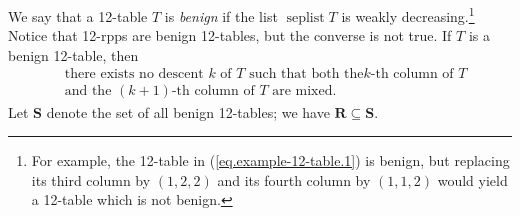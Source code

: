 \documentclass[numbers=enddot,12pt,final,onecolumn,notitlepage]{scrartcl}%
\theoremstyle{definition}
\begin{document}
We say that a 12-table $T$ is \textit{benign} if the list
$\operatorname*{seplist}T$ is weakly decreasing.\footnote{For
example, the 12-table in (\ref{eq.example-12-table.1}) is benign,
but replacing its third column by $\left(1,2,2\right)$ and its
fourth column by $\left(1,1,2\right)$ would yield a 12-table
which is not benign.}
Notice that 12-rpps are benign 12-tables, but the converse is not true. If $T$ is a benign 12-table, then%
\begin{align}
&  \text{there exists no descent }k\text{ of }T\text{ such that both the
}k\text{-th column of }T\nonumber\\
&  \text{and the }\left(  k+1\right)  \text{-th column of }T\text{ are mixed.}
\label{eq.benign.not-both-mixed}%
\end{align}
Let $\mathbf{S}$ denote the set of all benign 12-tables; we have $\mathbf{R}\subseteq\mathbf{S}$.
\end{document}
